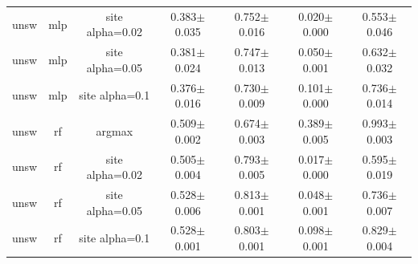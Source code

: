 \begin{tabular}{lcccccc}
unsw & mlp & site alpha=0.02 & 0.383$\pm$0.035 & 0.752$\pm$0.016 & 0.020$\pm$0.000 & 0.553$\pm$0.046 \\
unsw & mlp & site alpha=0.05 & 0.381$\pm$0.024 & 0.747$\pm$0.013 & 0.050$\pm$0.001 & 0.632$\pm$0.032 \\
unsw & mlp & site alpha=0.1 & 0.376$\pm$0.016 & 0.730$\pm$0.009 & 0.101$\pm$0.000 & 0.736$\pm$0.014 \\
unsw & rf & argmax & 0.509$\pm$0.002 & 0.674$\pm$0.003 & 0.389$\pm$0.005 & 0.993$\pm$0.003 \\
unsw & rf & site alpha=0.02 & 0.505$\pm$0.004 & 0.793$\pm$0.005 & 0.017$\pm$0.000 & 0.595$\pm$0.019 \\
unsw & rf & site alpha=0.05 & 0.528$\pm$0.006 & 0.813$\pm$0.001 & 0.048$\pm$0.001 & 0.736$\pm$0.007 \\
unsw & rf & site alpha=0.1 & 0.528$\pm$0.001 & 0.803$\pm$0.001 & 0.098$\pm$0.001 & 0.829$\pm$0.004 \\
\bottomrule
\end{tabular}

